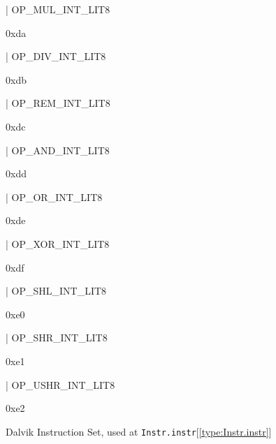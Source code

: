 \documentclass[11pt]{article}
\begin{document}
\begin{ocamldoccode}
  | OP_MUL_INT_LIT8
\end{ocamldoccode}
\begin{ocamldoccomment}
0xda
\end{ocamldoccomment}
\begin{ocamldoccode}
  | OP_DIV_INT_LIT8
\end{ocamldoccode}
\begin{ocamldoccomment}
0xdb
\end{ocamldoccomment}
\begin{ocamldoccode}
  | OP_REM_INT_LIT8
\end{ocamldoccode}
\begin{ocamldoccomment}
0xdc
\end{ocamldoccomment}
\begin{ocamldoccode}
  | OP_AND_INT_LIT8
\end{ocamldoccode}
\begin{ocamldoccomment}
0xdd
\end{ocamldoccomment}
\begin{ocamldoccode}
  | OP_OR_INT_LIT8
\end{ocamldoccode}
\begin{ocamldoccomment}
0xde
\end{ocamldoccomment}
\begin{ocamldoccode}
  | OP_XOR_INT_LIT8
\end{ocamldoccode}
\begin{ocamldoccomment}
0xdf
\end{ocamldoccomment}
\begin{ocamldoccode}
  | OP_SHL_INT_LIT8
\end{ocamldoccode}
\begin{ocamldoccomment}
0xe0
\end{ocamldoccomment}
\begin{ocamldoccode}
  | OP_SHR_INT_LIT8
\end{ocamldoccode}
\begin{ocamldoccomment}
0xe1
\end{ocamldoccomment}
\begin{ocamldoccode}
  | OP_USHR_INT_LIT8
\end{ocamldoccode}
\begin{ocamldoccomment}
0xe2
\end{ocamldoccomment}
\begin{ocamldocdescription}
Dalvik Instruction Set, used at {\tt{Instr.instr}}[\ref{type:Instr.instr}]


\end{ocamldocdescription}
\end{document}
